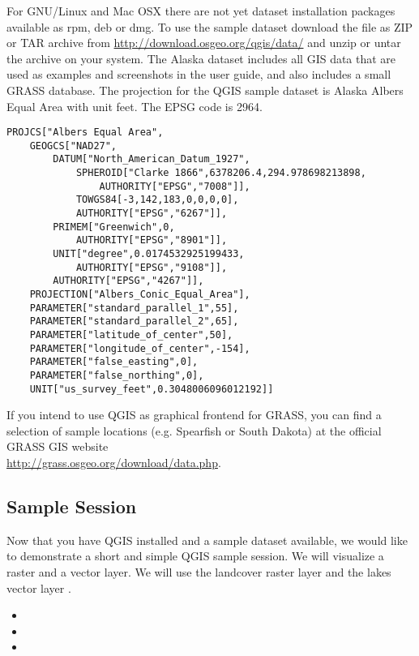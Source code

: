 \nix \osx For GNU/Linux and Mac OSX there are not yet dataset installation
packages available as rpm, deb or dmg. To use the sample dataset download the
file  as ZIP or TAR archive from
\url{http://download.osgeo.org/qgis/data/} and unzip or untar the archive on
your system. The Alaska dataset includes all GIS data that are used as
examples and screenshots in the user guide, and also includes a small GRASS
database. The projection for the QGIS sample dataset is Alaska Albers Equal
Area with unit feet. The EPSG code is 2964.

\begin{verbatim}
PROJCS["Albers Equal Area",
    GEOGCS["NAD27",
        DATUM["North_American_Datum_1927",
            SPHEROID["Clarke 1866",6378206.4,294.978698213898,
                AUTHORITY["EPSG","7008"]],
            TOWGS84[-3,142,183,0,0,0,0],
            AUTHORITY["EPSG","6267"]],
        PRIMEM["Greenwich",0,
            AUTHORITY["EPSG","8901"]],
        UNIT["degree",0.0174532925199433,
            AUTHORITY["EPSG","9108"]],
        AUTHORITY["EPSG","4267"]],
    PROJECTION["Albers_Conic_Equal_Area"],
    PARAMETER["standard_parallel_1",55],
    PARAMETER["standard_parallel_2",65],
    PARAMETER["latitude_of_center",50],
    PARAMETER["longitude_of_center",-154],
    PARAMETER["false_easting",0],
    PARAMETER["false_northing",0],
    UNIT["us_survey_feet",0.3048006096012192]]
\end{verbatim}

If you intend to use QGIS as graphical frontend for GRASS, you can find a
selection of sample locations (e.g. Spearfish or South Dakota) at the
official GRASS GIS website \\
\url{http://grass.osgeo.org/download/data.php}. 

\subsection{Sample Session}\label{samplesession}

Now that you have QGIS installed and a sample dataset available, we would 
like to demonstrate a short and simple QGIS sample session. We will visualize 
a raster and a vector layer. We will use the landcover raster 
layer  and the lakes 
vector layer .


\begin{itemize}
\item {}
\item {}
\item {}
\end{itemize} 

